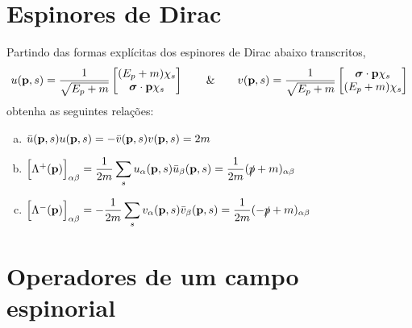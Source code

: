 \documentclass[a4paper, 11pt, oneside]{impression}
\begin{document}


\newpage

\chapter{Espinores de Dirac}\label{quest: five}

\begin{exercise}{}
    Partindo das formas explícitas dos espinores de Dirac abaixo transcritos,
        \begin{equation*}
            u(\vb{p},s) = \dfrac{1}{\sqrt{E_{p}+m}} \begin{bmatrix}
                (E_{p}+m)\chi_{s} \\
                \boldsymbol{\sigma}\cdot\vb{p} \chi_{s}
            \end{bmatrix} \qquad \& \qquad 
            v(\vb{p},s) = \dfrac{1}{\sqrt{E_{p} + m}} \begin{bmatrix}
                \boldsymbol{\sigma} \cdot \vb{p} \chi_{s} \\
                (E_{p} + m) \chi_{s}
            \end{bmatrix}
        \end{equation*}
    obtenha as seguintes relações:
    \begin{enumerate}[(a)]
        \item $\bar{u}(\vb{p},s) u(\vb{p},s) = -\bar{v}(\vb{p},s) v(\vb{p},s) = 2m$
        \item $\Big[\Lambda^{+}(\vb{p})\Big]_{\alpha\beta} = \dfrac{1}{2m}\displaystyle\sum_{s} u_{\alpha}(\vb{p},s) \bar{u}_{\beta}(\vb{p},s) = \dfrac{1}{2m}(\slashed{p} + m)_{\alpha\beta}$
        \item $\Big[\Lambda^{-}(\vb{p})\Big]_{\alpha\beta} = -\dfrac{1}{2m}\displaystyle\sum_{s} v_{\alpha}(\vb{p},s) \bar{v}_{\beta}(\vb{p},s) = \dfrac{1}{2m}(-\slashed{p} + m)_{\alpha\beta}$
    \end{enumerate}
\end{exercise}



\newpage

\chapter{Operadores de um campo espinorial}\label{quest: six}
\end{document}
